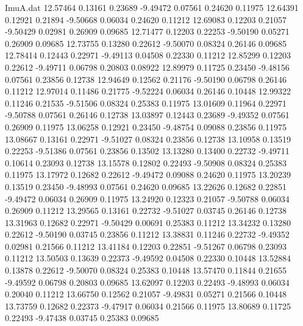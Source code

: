 \begin{filecontents}{ImuA.dat}
  12.57464    0.13161    0.23689   -9.49472    0.07561    0.24620    0.11975
  12.64391    0.12921    0.21894   -9.50668    0.06034    0.24620    0.11212
  12.69083    0.12203    0.21057   -9.50429    0.02981    0.26909    0.09685
  12.71477    0.12203    0.22253   -9.50190    0.05271    0.26909    0.09685
  12.73755    0.13280    0.22612   -9.50070    0.08324    0.26146    0.09685
  12.78414    0.12443    0.22971   -9.49113    0.04508    0.22330    0.11212
  12.85299    0.12203    0.22612   -9.49711    0.06798    0.20803    0.08922
  12.89979    0.11725    0.23450   -9.48156    0.07561    0.23856    0.12738
  12.94649    0.12562    0.21176   -9.50190    0.06798    0.26146    0.11212
  12.97014    0.11486    0.21775   -9.52224    0.06034    0.26146    0.10448
  12.99322    0.11246    0.21535   -9.51506    0.08324    0.25383    0.11975
  13.01609    0.11964    0.22971   -9.50788    0.07561    0.26146    0.12738
  13.03897    0.12443    0.23689   -9.49352    0.07561    0.26909    0.11975
  13.06258    0.12921    0.23450   -9.48754    0.09088    0.23856    0.11975
  13.08667    0.13161    0.22971   -9.51027    0.08324    0.23856    0.12738
  13.10958    0.13519    0.22253   -9.51386    0.07561    0.23856    0.13502
  13.13280    0.13400    0.22732   -9.49711    0.10614    0.23093    0.12738
  13.15578    0.12802    0.22493   -9.50908    0.08324    0.25383    0.11975
  13.17972    0.12682    0.22612   -9.49472    0.09088    0.24620    0.11975
  13.20239    0.13519    0.23450   -9.48993    0.07561    0.24620    0.09685
  13.22626    0.12682    0.22851   -9.49472    0.06034    0.26909    0.11975
  13.24920    0.12323    0.21057   -9.50788    0.06034    0.26909    0.11212
  13.29565    0.13161    0.22732   -9.51027    0.03745    0.26146    0.12738
  13.31963    0.12682    0.22971   -9.50429    0.00691    0.25383    0.11212
  13.34232    0.13280    0.22612   -9.50190    0.03745    0.23856    0.11212
  13.38831    0.11246    0.22732   -9.49352    0.02981    0.21566    0.11212
  13.41184    0.12203    0.22851   -9.51267    0.06798    0.23093    0.11212
  13.50503    0.13639    0.22373   -9.49592    0.04508    0.22330    0.10448
  13.52884    0.13878    0.22612   -9.50070    0.08324    0.25383    0.10448
  13.57470    0.11844    0.21655   -9.49592    0.06798    0.20803    0.09685
  13.62097    0.12203    0.22493   -9.48993    0.06034    0.20040    0.11212
  13.66750    0.12562    0.21057   -9.49831    0.05271    0.21566    0.10448
  13.73759    0.12682    0.22373   -9.47917    0.06034    0.21566    0.11975
  13.80689    0.11725    0.22493   -9.47438    0.03745    0.25383    0.09685

\end{filecontents}
